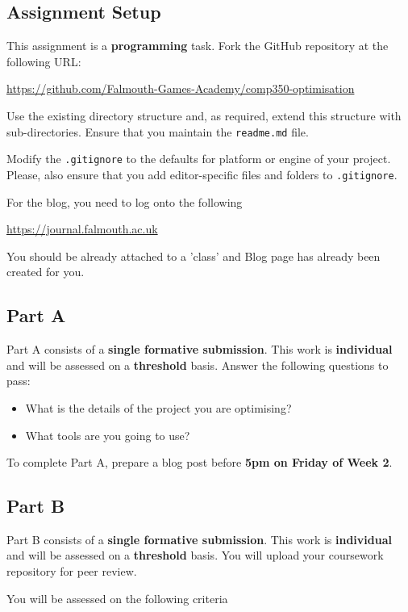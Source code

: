 \documentclass{../../fal_assignment}
\begin{document}
\subsection*{Assignment Setup}

This assignment is a \textbf{programming} task. Fork the GitHub repository at the following URL:

\indent \url{https://github.com/Falmouth-Games-Academy/comp350-optimisation}

Use the existing directory structure and, as required, extend this structure with sub-directories.
Ensure that you maintain the \texttt{readme.md} file.

Modify the \texttt{.gitignore} to the defaults for platform or engine of your project.
Please, also ensure that you add editor-specific files and folders to \texttt{.gitignore}. 

For the blog, you need to log onto the following

\indent \url{https://journal.falmouth.ac.uk}

You should be already attached to a 'class' and Blog page has already been created for you.

\subsection*{Part A}

Part A consists of a \textbf{single formative submission}. This work is \textbf{individual} and will be assessed on a \textbf{threshold} basis. Answer the following questions to pass:

\begin{itemize}
	\item What is the details of the project you are optimising?
	\item What tools are you going to use?
\end{itemize}

To complete Part A, prepare a blog post before \textbf{5pm on Friday of Week 2}.

\subsection*{Part B}

Part B consists of a \textbf{single formative submission}. This work is \textbf{individual} and will be assessed on a \textbf{threshold} basis. You will upload your coursework repository for peer review.

You will be assessed on the following criteria 
\end{document}
